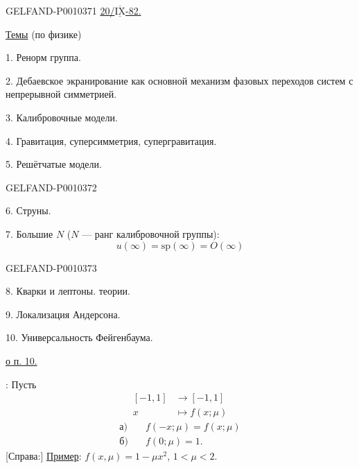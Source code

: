 \begin{GelfandAdjacentEvidence}{GELFAND-P001037}{1}
\underline{20/$\overline{\underline{\mathrm{IX}}}$-82.}\qquad {}


\underline{Темы} (по физике)

1. Ренорм группа.

2. Дебаевское экранирование как основной механизм фазовых переходов систем с непрерывной симметрией.

3. Калибровочные модели.

4. Гравитация, суперсимметрия, супергравитация.


5. Решётчатые модели.
\end{GelfandAdjacentEvidence}
\begin{GelfandAdjacentEvidence}{GELFAND-P001037}{2}


6. Струны.

7. Большие $N$ ($N$ --- ранг калибровочной группы):
\[
u(\infty)=\mathrm{sp}(\infty)=O(\infty)
\]
\end{GelfandAdjacentEvidence}
\begin{GelfandAdjacentEvidence}{GELFAND-P001037}{3}


8. Кварки и лептоны.  теории.

9. Локализация Андерсона.

10. Универсальность Фейгенбаума.
\end{GelfandAdjacentEvidence}


 \underline{о п. 10.}

: Пусть
\[
\begin{aligned}
[-1,1]&\longrightarrow[-1,1]\\
x&\longmapsto f(x;\mu)
\end{aligned}
\]
\[
\begin{aligned}
\text{а)}\quad &f(-x;\mu)=f(x;\mu)\\
\text{б)}\quad &f(0;\mu)=1.
\end{aligned}
\]
[Справа:] \underline{Пример}: $f(x,\mu)=1-\mu x^2$, $1<\mu<2$.


